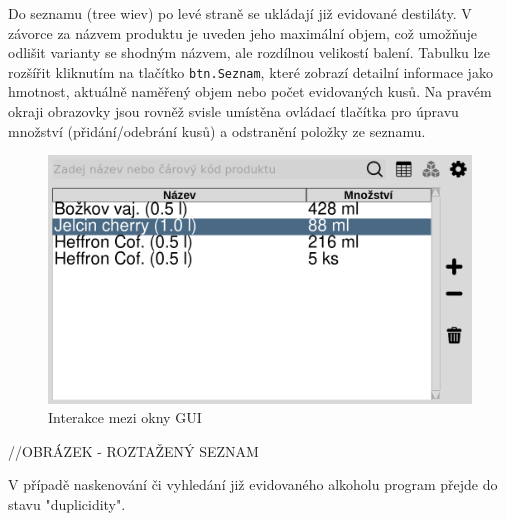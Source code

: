 
Do seznamu (tree wiev) po levé straně se ukládají již evidované destiláty. V závorce za názvem produktu je uveden jeho maximální objem, což umožňuje odlišit varianty se shodným názvem, ale rozdílnou velikostí balení. Tabulku lze rozšířit kliknutím na tlačítko \texttt{btn.Seznam}, které zobrazí detailní informace jako hmotnost, aktuálně naměřený objem nebo počet evidovaných kusů. Na pravém okraji obrazovky jsou rovněž svisle umístěna ovládací tlačítka pro úpravu množství (přidání/odebrání kusů) a odstranění položky ze seznamu.

\begin{figure}[H]
    \begin{center}
        \includegraphics[scale=0.4]{obrazky/GUI Rošířený seznam.png}
    \end{center}
    \caption{Interakce mezi okny GUI}
    \label{Interakce mezi okny GUI}
\end{figure}
//OBRÁZEK - ROZTAŽENÝ SEZNAM

V případě naskenování či vyhledání již evidovaného alkoholu program přejde do stavu "duplicidity".


